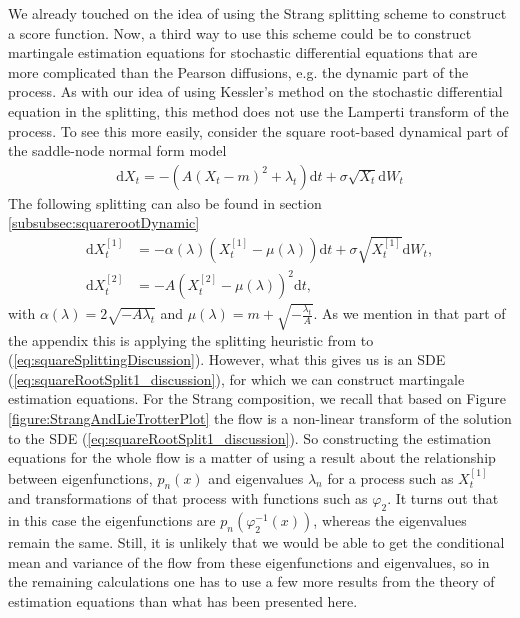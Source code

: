 We already touched on the idea of using the Strang splitting scheme to construct a score function. Now, a third way to use this scheme could be to construct martingale estimation equations for stochastic differential equations that are more complicated than the Pearson diffusions, e.g. the dynamic part of the process. As with our idea of using Kessler's method on the stochastic differential equation in the splitting, this method does not use the Lamperti transform of the process. To see this more easily, consider the square root-based dynamical part of the saddle-node normal form model
\begin{align}
    \mathrm{d}X_t = -(A(X_t - m)^2 + \lambda_t)\mathrm{d}t + \sigma\sqrt{X_t}\mathrm{d}W_t \label{eq:squareSplittingDiscussion}
\end{align}  
The following splitting can also be found in section \ref{subsubsec:squarerootDynamic}
\begin{align}
    \mathrm{d}X_t^{[1]} &= -\alpha(\lambda)\left(X_t^{[1]} - \mu(\lambda)\right)  \mathrm{d}t + \sigma \sqrt{X_t^{[1]}} \mathrm{d}W_t, \label{eq:squareRootSplit1_discussion} \\
    \mathrm{d}X_t^{[2]} &= - A \left(X_t^{[2]} - \mu(\lambda)\right)^2 \mathrm{d}t, \label{eq:squareRootSplit2_discussion}
\end{align}
with $\alpha(\lambda) = 2\sqrt{-A\lambda_t}$ and $\mu(\lambda) = m + \sqrt{-\frac{\lambda_t}{A}}$. As we mention in that part of the appendix this is applying the splitting heuristic from \cite{SplittingSchemes} to (\ref{eq:squareSplittingDiscussion}). However, what this gives us is an SDE (\ref{eq:squareRootSplit1_discussion}), for which we can construct martingale estimation equations. For the Strang composition, we recall that based on Figure \ref{figure:StrangAndLieTrotterPlot} the flow is a non-linear transform of the solution to the SDE (\ref{eq:squareRootSplit1_discussion}). So constructing the estimation equations for the whole flow is a matter of using a result about the relationship between eigenfunctions, $p_n(x)$ and eigenvalues $\lambda_n$ for a process such as $X_t^{[1]}$ and transformations of that process with functions such as $\varphi_2$. It turns out \cite[remark on p. 41]{StatisticalMethodsForSDE} that in this case the eigenfunctions are $p_n\left(\varphi_2^{-1}(x)\right)$, whereas the eigenvalues remain the same. Still, it is unlikely that we would be able to get the conditional mean and variance of the flow from these eigenfunctions and eigenvalues, so in the remaining calculations one has to use a few more results from the theory of estimation equations than what has been presented here.
\newpage
